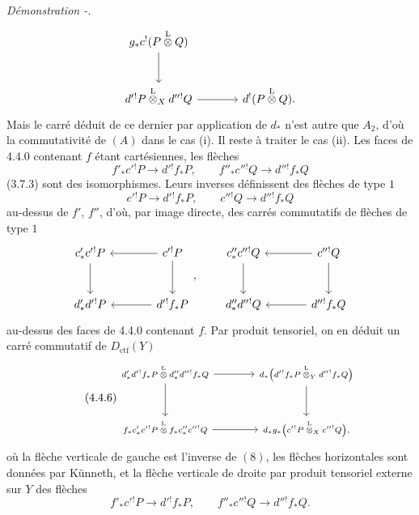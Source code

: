 \documentclass[11pt]{article}
\newenvironment{prooftext}[1][Proof]{\par\noindent\emph{#1.}\ }{\par\medskip}
\providecommand{\Dctf}{D_{\mathrm{ctf}}}
\providecommand{\Dctf}{D_{\mathrm{ctf}}}
\begin{document}
\begin{prooftext}[Démonstration -]
\[\begin{tikzcd}[column sep=large,row sep=large]
g_*c^!(P\overset{\mathrm{L}}{\otimes}Q)\arrow[d]\\
d'{}^!P\overset{\mathrm{L}}{\otimes}_Xd''{}^!Q \arrow[r] &
d^!(P\overset{\mathrm{L}}{\otimes}Q).
\end{tikzcd}
\]
Mais le carré déduit de ce dernier par application de $d_*$ n'est autre que $A_2$, d'où la commutativité de $(A)$ dans le cas (i). Il reste à traiter le cas (ii). Les faces de 4.4.0 contenant $f$ étant cartésiennes, les flèches
\[
f'_*c'{}^!P\longrightarrow d'{}^!f_*P,\qquad
f''_*c''{}^!Q\longrightarrow d''{}^!f_*Q
\]
(3.7.3) sont des isomorphismes. Leurs inverses définissent des flèches de type $1$
\[
c'{}^!P\longrightarrow d'{}^!f_*P,\qquad
c''{}^!Q\longrightarrow d''{}^!f_*Q
\]
au-dessus de $f'$, $f''$, d'où, par image directe, des carrés commutatifs de flèches de type $1$
\[
\begin{tikzcd}[column sep=large,row sep=large]
c'_*c'{}^!P \arrow[d] & c'{}^!P\arrow[l]\arrow[d]\\
d'_*d'{}^!P & d'{}^!f_*P\arrow[l]
\end{tikzcd}
,\qquad
\begin{tikzcd}[column sep=large,row sep=large]
c''_*c''{}^!Q \arrow[d] & c''{}^!Q\arrow[l]\arrow[d]\\
d''_*d''{}^!Q & d''{}^!f_*Q\arrow[l]
\end{tikzcd}
\]
au-dessus des faces de 4.4.0 contenant $f$. Par produit tensoriel, on en déduit un carré commutatif de $\Dctf(Y)$
\begin{equation}
\tag{4.4.6}
\begin{tikzcd}[column sep=large,row sep=large,cells={nodes={font=\scriptsize}},every label/.append style={font=\scriptsize}]
d'_*d'{}^!f_*P\overset{\mathrm{L}}{\otimes}d''_*d''{}^!f_*Q
 \arrow[r]\arrow[d] &
d_*\bigl(d'{}^!f_*P\overset{\mathrm{L}}{\otimes}_Yd''{}^!f_*Q\bigr)\arrow[d]\\
f_*c'_*c'{}^!P\overset{\mathrm{L}}{\otimes}f_*c''_*c''{}^!Q
 \arrow[r] &
d_*g_*\bigl(c'{}^!P\overset{\mathrm{L}}{\otimes}_Xc''{}^!Q\bigr),
\end{tikzcd}
\end{equation}
où la flèche verticale de gauche est l'inverse de $(8)$, les flèches horizontales sont données par Künneth, et la flèche verticale de droite par produit tensoriel externe sur $Y$ des flèches
\[
f'_*c'{}^!P\longrightarrow d'{}^!f_*P,\qquad
f''_*c''{}^!Q\longrightarrow d''{}^!f_*Q.
\]
\end{prooftext}
\end{document}
